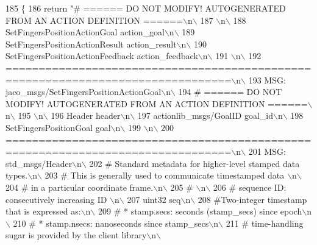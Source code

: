 \begin{DoxyCode}
185   \{
186     \textcolor{keywordflow}{return} \textcolor{stringliteral}{"# ====== DO NOT MODIFY! AUTOGENERATED FROM AN ACTION DEFINITION ======\(\backslash\)n\(\backslash\)}
187 \textcolor{stringliteral}{\(\backslash\)n\(\backslash\)}
188 \textcolor{stringliteral}{SetFingersPositionActionGoal action\_goal\(\backslash\)n\(\backslash\)}
189 \textcolor{stringliteral}{SetFingersPositionActionResult action\_result\(\backslash\)n\(\backslash\)}
190 \textcolor{stringliteral}{SetFingersPositionActionFeedback action\_feedback\(\backslash\)n\(\backslash\)}
191 \textcolor{stringliteral}{\(\backslash\)n\(\backslash\)}
192 \textcolor{stringliteral}{================================================================================\(\backslash\)n\(\backslash\)}
193 \textcolor{stringliteral}{MSG: jaco\_msgs/SetFingersPositionActionGoal\(\backslash\)n\(\backslash\)}
194 \textcolor{stringliteral}{# ====== DO NOT MODIFY! AUTOGENERATED FROM AN ACTION DEFINITION ======\(\backslash\)n\(\backslash\)}
195 \textcolor{stringliteral}{\(\backslash\)n\(\backslash\)}
196 \textcolor{stringliteral}{Header header\(\backslash\)n\(\backslash\)}
197 \textcolor{stringliteral}{actionlib\_msgs/GoalID goal\_id\(\backslash\)n\(\backslash\)}
198 \textcolor{stringliteral}{SetFingersPositionGoal goal\(\backslash\)n\(\backslash\)}
199 \textcolor{stringliteral}{\(\backslash\)n\(\backslash\)}
200 \textcolor{stringliteral}{================================================================================\(\backslash\)n\(\backslash\)}
201 \textcolor{stringliteral}{MSG: std\_msgs/Header\(\backslash\)n\(\backslash\)}
202 \textcolor{stringliteral}{# Standard metadata for higher-level stamped data types.\(\backslash\)n\(\backslash\)}
203 \textcolor{stringliteral}{# This is generally used to communicate timestamped data \(\backslash\)n\(\backslash\)}
204 \textcolor{stringliteral}{# in a particular coordinate frame.\(\backslash\)n\(\backslash\)}
205 \textcolor{stringliteral}{# \(\backslash\)n\(\backslash\)}
206 \textcolor{stringliteral}{# sequence ID: consecutively increasing ID \(\backslash\)n\(\backslash\)}
207 \textcolor{stringliteral}{uint32 seq\(\backslash\)n\(\backslash\)}
208 \textcolor{stringliteral}{#Two-integer timestamp that is expressed as:\(\backslash\)n\(\backslash\)}
209 \textcolor{stringliteral}{# * stamp.secs: seconds (stamp\_secs) since epoch\(\backslash\)n\(\backslash\)}
210 \textcolor{stringliteral}{# * stamp.nsecs: nanoseconds since stamp\_secs\(\backslash\)n\(\backslash\)}
211 \textcolor{stringliteral}{# time-handling sugar is provided by the client library\(\backslash\)n\(\backslash\)}

\end{DoxyCode}
